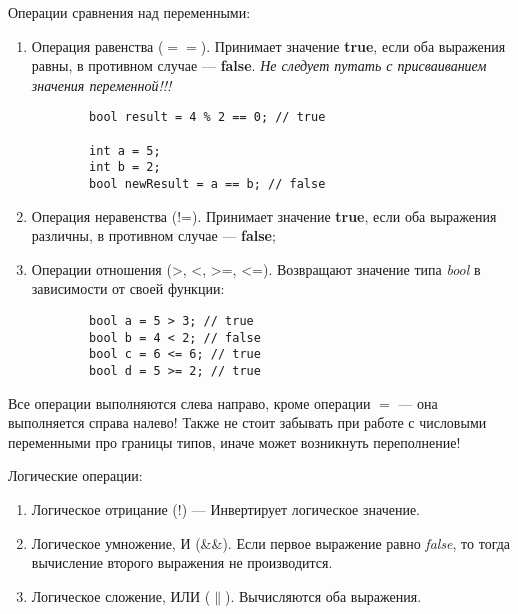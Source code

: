 Операции сравнения над переменными:
\begin{enumerate}
    \item Операция равенства ($==$). Принимает значение \textbf{true}, если оба выражения равны, в противном случае --- \textbf{false}. \textit{Не следует путать с присваиванием значения переменной!!!}
    
    \lstset{style=CPlusPlus}
    \begin{lstlisting}
        bool result = 4 % 2 == 0; // true
        
        int a = 5;
        int b = 2;
        bool newResult = a == b; // false 
    \end{lstlisting}    
    
    \item Операция неравенства (!=). Принимает значение \textbf{true}, если оба выражения различны, в противном случае --- \textbf{false};
    \item Операции отношения (>, <, >=, <=). Возвращают значение типа \textit{bool} в зависимости от своей функции:
    
    \lstset{style=CPlusPlus}
    \begin{lstlisting}
        bool a = 5 > 3; // true
        bool b = 4 < 2; // false
        bool c = 6 <= 6; // true
        bool d = 5 >= 2; // true
    \end{lstlisting}
\end{enumerate}

Все операции выполняются слева направо, кроме операции $=$ --- она выполняется справа налево! Также не стоит забывать при работе с числовыми переменными про границы типов, иначе может возникнуть переполнение!

\newpage

Логические операции:

\begin{enumerate}
    \item Логическое отрицание (!) --- Инвертирует логическое значение.
    \item Логическое умножение, И (\&\&). Если первое выражение равно \textit{false}, то тогда вычисление второго выражения не производится.
    \item Логическое сложение, ИЛИ ($\parallel$). Вычисляются оба выражения.
\end{enumerate}


